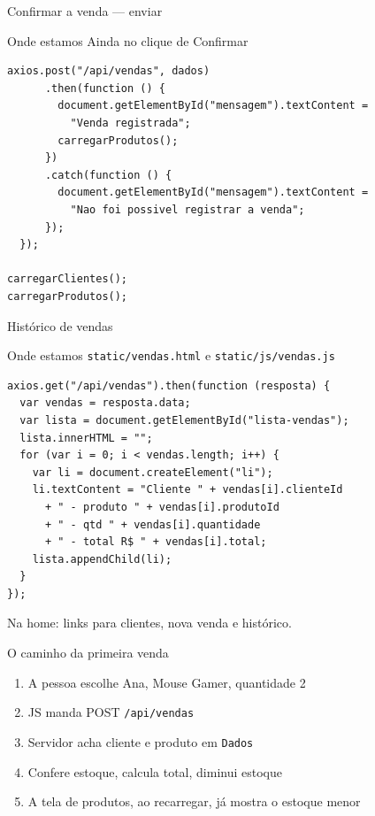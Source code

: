 \documentclass[aspectratio=169,11pt]{beamer}
\newcommand{\onde}[1]{%
  \begin{block}{Onde estamos}
    #1
  \end{block}
}
\begin{document}
\begin{frame}[fragile]{Confirmar a venda --- enviar}
  \onde{Ainda no clique de Confirmar}

\begin{lstlisting}[basicstyle=\ttfamily\scriptsize]
    axios.post("/api/vendas", dados)
      .then(function () {
        document.getElementById("mensagem").textContent =
          "Venda registrada";
        carregarProdutos();
      })
      .catch(function () {
        document.getElementById("mensagem").textContent =
          "Nao foi possivel registrar a venda";
      });
  });

carregarClientes();
carregarProdutos();
\end{lstlisting}
\end{frame}

\begin{frame}[fragile]{Histórico de vendas}
  \onde{\texttt{static/vendas.html} e \texttt{static/js/vendas.js}}

\begin{lstlisting}[basicstyle=\ttfamily\scriptsize]
axios.get("/api/vendas").then(function (resposta) {
  var vendas = resposta.data;
  var lista = document.getElementById("lista-vendas");
  lista.innerHTML = "";
  for (var i = 0; i < vendas.length; i++) {
    var li = document.createElement("li");
    li.textContent = "Cliente " + vendas[i].clienteId
      + " - produto " + vendas[i].produtoId
      + " - qtd " + vendas[i].quantidade
      + " - total R$ " + vendas[i].total;
    lista.appendChild(li);
  }
});
\end{lstlisting}

  Na home: links para clientes, nova venda e histórico.
\end{frame}

\begin{frame}{O caminho da primeira venda}
  \begin{enumerate}
    \item A pessoa escolhe Ana, Mouse Gamer, quantidade 2
    \item JS manda POST \texttt{/api/vendas}
    \item Servidor acha cliente e produto em \texttt{Dados}
    \item Confere estoque, calcula total, diminui estoque
    \item A tela de produtos, ao recarregar, já mostra
          o estoque menor
  \end{enumerate}
\end{frame}
\end{document}
